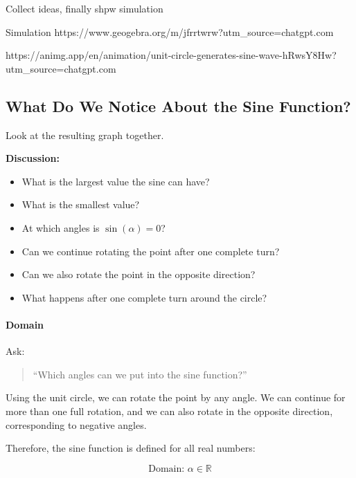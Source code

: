 \documentclass[a4paper,11pt]{article}
\begin{document}
Collect ideas, finally shpw simulation 

Simulation
https://www.geogebra.org/m/jfrrtwrw?utm_source=chatgpt.com

https://animg.app/en/animation/unit-circle-generates-sine-wave-hRwsY8Hw?utm_source=chatgpt.com


\begin{center}
\end{center}


\subsection*{ What Do We Notice About the Sine Function?}

Look at the resulting graph together.


\textbf{Discussion:}

\begin{itemize}
    \item What is the largest value the sine can have?
    \item What is the smallest value?
    \item At which angles is $\sin(\alpha)=0$?
    \item Can we continue rotating the point after one complete turn?
    \item Can we also rotate the point in the opposite direction?
    \item What happens after one complete turn around the circle?
\end{itemize}

\paragraph{Domain}

Ask:

\begin{quote}
    ``Which angles can we put into the sine function?''
\end{quote}

Using the unit circle, we can rotate the point by any angle.
We can continue for more than one full rotation, and we can also rotate
in the opposite direction, corresponding to negative angles.

Therefore, the sine function is defined for all real numbers:

\begin{equation}
    \boxed{\text{Domain: } \alpha \in \mathbb{R}}
\end{equation}
\end{document}
